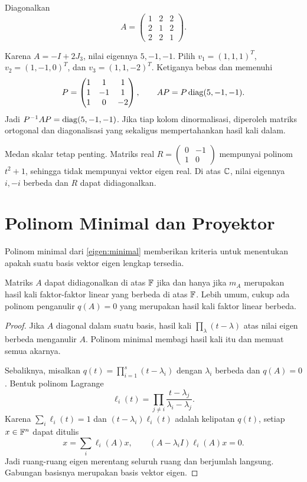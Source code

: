 \begin{exam}
    Diagonalkan
    \[
        A=\begin{pmatrix}1&2&2\\2&1&2\\2&2&1\end{pmatrix}.
    \]
\end{exam}
\begin{solution}
    Karena $A=-I+2J_3$, nilai eigennya $5,-1,-1$.
    Pilih $v_1=(1,1,1)^T$, $v_2=(1,-1,0)^T$, dan $v_3=(1,1,-2)^T$.
    Ketiganya bebas dan memenuhi
    \[
        P=\begin{pmatrix}1&1&1\\1&-1&1\\1&0&-2\end{pmatrix},\qquad
        AP=P\operatorname{diag}(5,-1,-1).
    \]
    Jadi $P^{-1}AP=\operatorname{diag}(5,-1,-1)$.
    Jika tiap kolom dinormalisasi, diperoleh matriks ortogonal dan
    diagonalisasi yang sekaligus mempertahankan hasil kali dalam.
\end{solution}

Medan skalar tetap penting. Matriks real
$R=\begin{pmatrix}0&-1\\1&0\end{pmatrix}$ mempunyai polinom
$t^2+1$, sehingga tidak mempunyai vektor eigen real.
Di atas $\mathbb{C}$, nilai eigennya $i,-i$ berbeda dan $R$ dapat didiagonalkan.

\section{Polinom Minimal dan Proyektor}
\label{dekomp:polinom}

Polinom minimal dari \autoref{eigen:minimal} memberikan kriteria
untuk menentukan apakah suatu basis vektor eigen lengkap tersedia.

\begin{teorema}
    Matriks $A$ dapat didiagonalkan di atas $\mathbb{F}$ jika dan hanya jika
    $m_A$ merupakan hasil kali faktor-faktor linear yang berbeda di atas $\mathbb{F}$.
    Lebih umum, cukup ada polinom penganulir $q(A)=0$ yang merupakan
    hasil kali faktor linear berbeda.
\end{teorema}
\begin{proof}
    Jika $A$ diagonal dalam suatu basis, hasil kali
    $\prod_\lambda(t-\lambda)$ atas nilai eigen berbeda menganulir $A$.
    Polinom minimal membagi hasil kali itu dan memuat semua akarnya.

    Sebaliknya, misalkan $q(t)=\prod_{i=1}^s(t-\lambda_i)$ dengan
    $\lambda_i$ berbeda dan $q(A)=0$.
    Bentuk polinom Lagrange
    \[
        \ell_i(t)=\prod_{j\ne i}\frac{t-\lambda_j}{\lambda_i-\lambda_j}.
    \]
    Karena $\sum_i\ell_i(t)=1$ dan $(t-\lambda_i)\ell_i(t)$
    adalah kelipatan $q(t)$, setiap $x\in\mathbb{F}^n$ dapat ditulis
    \[
        x=\sum_i\ell_i(A)x,\qquad
        (A-\lambda_iI)\ell_i(A)x=0.
    \]
    Jadi ruang-ruang eigen merentang seluruh ruang dan berjumlah langsung.
    Gabungan basisnya merupakan basis vektor eigen.
\end{proof}

